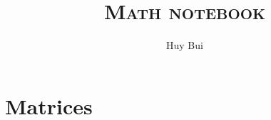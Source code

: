 \documentclass[twoside]{book}
\author{Huy Bui}
\title{\textsc{Math notebook}}
\theoremstyle{definition}
\begin{document}
\maketitle
\tableofcontents
\part{Matrices}



\end{document}
